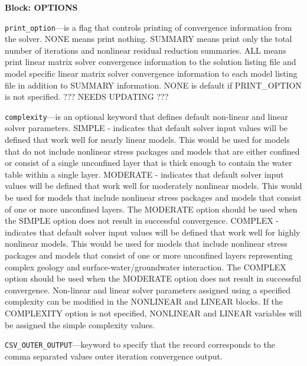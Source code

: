 
\item \textbf{Block: OPTIONS}

\begin{description}
\item \texttt{print\_option}---is a flag that controls printing of convergence information from the solver.  NONE means print nothing. SUMMARY means print only the total number of iterations and nonlinear residual reduction summaries. ALL means print linear matrix solver convergence information to the solution listing file and model specific linear matrix solver convergence information to each model listing file in addition to SUMMARY information. NONE is default if PRINT\_OPTION is not specified.  ??? NEEDS UPDATING ???

\item \texttt{complexity}---is an optional keyword that defines default non-linear and linear solver parameters.  SIMPLE - indicates that default solver input values will be defined that work well for nearly linear models. This would be used for models that do not include nonlinear stress packages and models that are either confined or consist of a single unconfined layer that is thick enough to contain the water table within a single layer. MODERATE - indicates that default solver input values will be defined that work well for moderately nonlinear models. This would be used for models that include nonlinear stress packages and models that consist of one or more unconfined layers. The MODERATE option should be used when the SIMPLE option does not result in successful convergence.  COMPLEX - indicates that default solver input values will be defined that work well for highly nonlinear models. This would be used for models that include nonlinear stress packages and models that consist of one or more unconfined layers representing complex geology and surface-water/groundwater interaction. The COMPLEX option should be used when the MODERATE option does not result in successful convergence.  Non-linear and linear solver parameters assigned using a specified complexity can be modified in the NONLINEAR and LINEAR blocks. If the COMPLEXITY option is not specified, NONLINEAR and LINEAR variables will be assigned the simple complexity values.

\item \texttt{CSV\_OUTER\_OUTPUT}---keyword to specify that the record corresponds to the comma separated values outer iteration convergence output.


\end{description}
